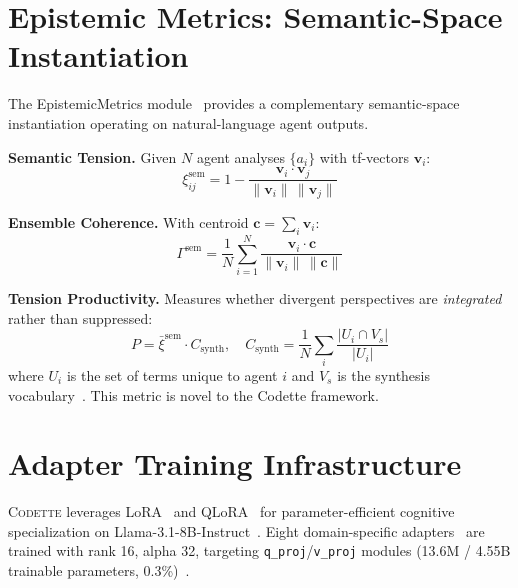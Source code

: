 \documentclass[conference]{IEEEtran}
\newcommand{\codette}{\textsc{Codette}}
\begin{document}
\section{Epistemic Metrics: Semantic-Space Instantiation}
\label{sec:epistemic}

The EpistemicMetrics module~\cite{harrison2026codettefull} provides a complementary semantic-space instantiation operating on natural-language agent outputs.

\textbf{Semantic Tension.} Given $N$ agent analyses $\{a_i\}$ with tf-vectors $\mathbf{v}_i$:
\begin{equation}
  \xi_{ij}^{\text{sem}} = 1 - \frac{\mathbf{v}_i \cdot \mathbf{v}_j}{\|\mathbf{v}_i\| \, \|\mathbf{v}_j\|}
  \label{eq:semantic_tension}
\end{equation}

\textbf{Ensemble Coherence.} With centroid $\mathbf{c} = \sum_i \mathbf{v}_i$:
\begin{equation}
  \Gamma^{\text{sem}} = \frac{1}{N} \sum_{i=1}^{N} \frac{\mathbf{v}_i \cdot \mathbf{c}}{\|\mathbf{v}_i\| \, \|\mathbf{c}\|}
  \label{eq:semantic_coherence}
\end{equation}

\textbf{Tension Productivity.} Measures whether divergent perspectives are \emph{integrated} rather than suppressed:
\begin{equation}
  P = \bar{\xi}^{\text{sem}} \cdot C_{\text{synth}}, \quad C_{\text{synth}} = \frac{1}{N}\sum_i \frac{|U_i \cap V_s|}{|U_i|}
  \label{eq:productivity}
\end{equation}
where $U_i$ is the set of terms unique to agent $i$ and $V_s$ is the synthesis vocabulary~\cite{harrison2026codettefull}. This metric is novel to the Codette framework.

\section{Adapter Training Infrastructure}
\label{sec:training}

\codette{} leverages LoRA~\cite{hu2021lora} and QLoRA~\cite{dettmers2023qlora} for parameter-efficient cognitive specialization on Llama-3.1-8B-Instruct~\cite{grattafiori2024llama}. Eight domain-specific adapters~\cite{harrison2025codettehf} are trained with rank 16, alpha 32, targeting \texttt{q\_proj}/\texttt{v\_proj} modules (13.6M / 4.55B trainable parameters, 0.3\%)~\cite{harrison2026codettefull}.
\end{document}
